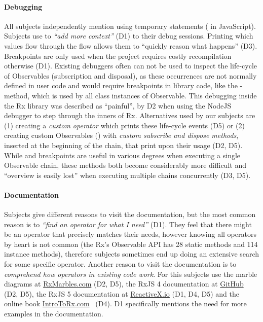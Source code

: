 \paragraph{Debugging}
All subjects independently mention using temporary \printfdebugging{} statements ( in JavaScript).
Subjects use \printfdebugging{} to \emph{``add more context''} (D1) to their debug sessions. 
Printing which values flow through the flow allows them to ``quickly reason what happens'' (D3). 
Breakpoints are only used when the project requires costly recompilation otherwise (D1).
Existing debuggers often can not be used to inspect the life-cycle of Observables (subscription and disposal),
as these occurrences are not normally defined in user code and would require breakpoints in library code, 
like the -method, which is used by all class instances of Observable. 
This debugging inside the Rx library was described as ``painful'', by D2 when using the NodeJS debugger to step through the inners of Rx.
Alternatives used by our subjects are (1) creating a \emph{custom  operator} which prints these life-cycle events (D5) or (2) creating custom Observables () with \emph{custom subscribe and dispose methods}, inserted at the beginning of the chain, that print upon their usage (D2, D5).
While \printfdebugging{} and breakpoints are useful in various degrees when executing a single Observable chain,
these methods both become considerably more difficult and ``overview is easily lost'' when executing multiple chains concurrently (D3, D5).

\paragraph{Documentation}
Subjects give different reasons to visit the documentation, but the most common reason is to \emph{``find an operator for what I need''} (D1). They feel that there might be an operator that precisely matches their needs, however knowing all operators by heart is not common (the Rx's Observable API has 28 static methods and 114 instance methods), therefore subjects sometimes end up doing an extensive search for some specific operator. Another reason to visit the documentation is to \emph{comprehend how operators in existing code work}. For this subjects use the marble diagrams at \href{http://rxmarbles.com}{RxMarbles.com} (D2, D5), the RxJS 4 documentation at \href{https://github.com/Reactive-Extensions/RxJS/blob/master/doc/}{GitHub} (D2, D5), the RxJS 5 documentation at \href{http://reactivex.io/rxjs}{ReactiveX.io} (D1, D4, D5) and the online book \href{http://introtorx.com}{IntroToRx.com}~\cite{introtorx} (D4). D1 specifically mentions the need for more examples in the documentation.


